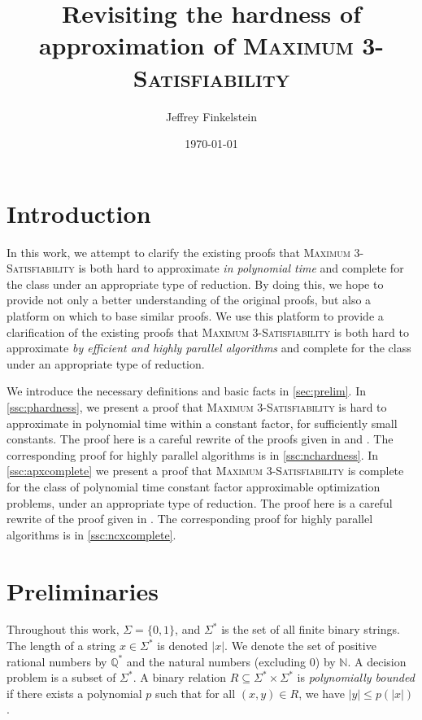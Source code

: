 \documentclass[]{article}
\author{Jef{}frey Finkelstein}
\date{\today}
\title{Revisiting the hardness of approximation of \texorpdfstring{\textsc{Maximum 3-Satisfiability}}{Maximum 3-Satisfiability}}
\begin{document}
\maketitle

\section{Introduction}

In this work, we attempt to clarify the existing proofs that \textsc{Maximum 3-Satisfiability} is both hard to approximate \emph{in polynomial time} and complete for the class \APX{} under an appropriate type of reduction.
By doing this, we hope to provide not only a better understanding of the original proofs, but also a platform on which to base similar proofs.
We use this platform to provide a clarification of the existing proofs that \textsc{Maximum 3-Satisfiability} is both hard to approximate \emph{by efficient and highly parallel algorithms} and complete for the class \NCX{} under an appropriate type of reduction.

We introduce the necessary definitions and basic facts in \autoref{sec:prelim}.
In \autoref{ssc:phardness}, we present a proof that \textsc{Maximum 3-Satisfiability} is hard to approximate in polynomial time within a constant factor, for sufficiently small constants.
The proof here is a careful rewrite of the proofs given in \cite[Theorem~6.3]{book} and \cite[Corollary~29.8]{vazirani}.
The corresponding proof for highly parallel algorithms is in \autoref{ssc:nchardness}.
In \autoref{ssc:apxcomplete} we present a proof that \textsc{Maximum 3-Satisfiability} is complete for the class of polynomial time constant factor approximable optimization problems, under an appropriate type of reduction.
The proof here is a careful rewrite of the proof given in \cite[Theorem~8.6]{book}.
The corresponding proof for highly parallel algorithms is in \autoref{ssc:ncxcomplete}.

\section{Preliminaries}\label{sec:prelim}

Throughout this work, $\Sigma=\{0, 1\}$, and $\Sigma^*$ is the set of all finite binary strings.
The length of a string $x \in \Sigma^*$ is denoted $|x|$.
We denote the set of positive rational numbers by $\mathbb{Q}^*$ and the natural numbers (excluding 0) by $\mathbb{N}$.
A decision problem is a subset of $\Sigma^*$.
A binary relation $R \subseteq \Sigma^* \times \Sigma^*$ is \emph{polynomially bounded} if there exists a polynomial $p$ such that for all $(x, y) \in R$, we have $|y| \leq p(|x|)$.
\end{document}
